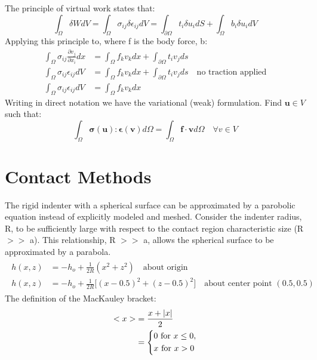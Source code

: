 \documentclass[12pt]{article}
\numberwithin{equation}{section}
\begin{document}
The principle of virtual work states that:
\begin{equation}\label{PVW}
\int_{\Omega} \delta W dV = \int_{\Omega} \sigma_{ij} \delta \epsilon_{ij} dV = \int_{\partial \Omega} t_i \delta u_i dS + \int_{\Omega} b_i \delta u_i dV 
\end{equation}
Applying this principle to, where f is  the body force, b: 
\begin{align*}
 \int_{\Omega} \sigma_{ij} \frac{\partial v_j}{\partial x_i} dx &= \int_{\Omega} f_k v_k dx + \int_{\partial \Omega} t_i v_j ds \\
 \int_{\Omega} \sigma_{ij} \epsilon_{ij} dV &= \int_{\Omega} f_k v_k dx + \int_{\partial \Omega} t_i v_j ds \quad \text{no traction applied} \\
  \int_{\Omega} \sigma_{ij} \epsilon_{ij} dV &= \int_{\Omega} f_k v_k dx
\end{align*}
Writing in direct notation we have the variational (weak) formulation. Find $\mathbf{u} \in V$ such that: 
\begin{equation}\label{weakForm}
\int_{\Omega} \mathbf{ \sigma(u) : \epsilon(v) } d \Omega = \int_{\Omega} \mathbf{ f \cdot v } d \Omega \quad \forall v \in V 
\end{equation}

\section{Contact Methods}
The rigid indenter with a spherical surface can be approximated by a parobolic equation instead of explicitly modeled and meshed. Consider the indenter radius, R, to be sufficiently large with respect to the contact region characteristic size (R $>>$ a). This relationship, R $>>$ a, allows the spherical surface to be approximated by a parabola.
\begin{align}\label{Indenter}
\begin{split}
h(x,z) &= - h_o + \frac{1}{2 R}(x^2 + z^2) \quad \text{about origin} \\
h(x, z) &= - h_o + \frac{1}{2 R}\big[ (x - 0.5)^2 + (z-0.5)^2 \big] \quad \text{about center point } (0.5, 0.5)
\end{split}
\end{align}
The definition of the MacKauley bracket:
\begin{align}\label{MacKauley}
\begin{split}
<x> &= \frac{x + |x|}{2} \\
&= 
\begin{dcases}
    0 \text{ for } x \leq 0, \\
    x \text{ for } x > 0
\end{dcases}
\end{split}
\end{align}
\end{document}
